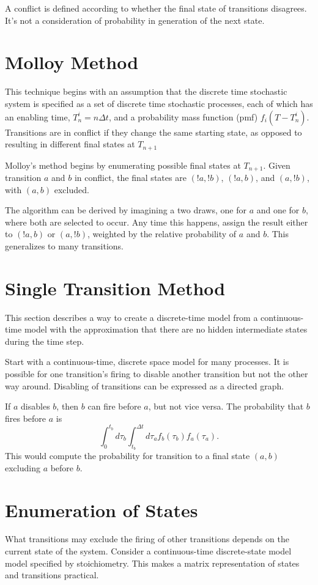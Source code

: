 \documentclass{article}
\begin{document}
A conflict is defined according to whether the
final state of transitions disagrees. It's not a consideration
of probability in generation of the next state.


\section{Molloy Method}
This technique begins with an assumption that
the discrete time stochastic system is specified as a
set of discrete time stochastic processes, each of which
has an enabling time, $T^i_n=n\Delta t$, and a probability
mass function (pmf) $f_i(T-T^i_n)$. Transitions are in
conflict if they change the same starting state, as opposed
to resulting in different final states at $T_{n+1}$

Molloy's method begins by enumerating possible final
states at $T_{n+1}$. Given transition $a$ and $b$ in conflict,
the final states are $(!a,!b)$, $(!a,b)$, and $(a,!b)$,
with $(a,b)$ excluded.

The algorithm can be derived by imagining a two draws, one
for $a$ and one for $b$, where both are selected to occur.
Any time this happens, assign the result either to
$(!a,b)$ or $(a,!b)$, weighted by the relative probability
of $a$ and $b$. This generalizes to many transitions.


\section{Single Transition Method}
This section describes a way to create a discrete-time
model from a continuous-time model with the approximation
that there are no hidden intermediate states during the
time step.

Start with a continuous-time, discrete space model
for many processes.
It is possible for one transition's firing to disable
another transition but not the other way around.
Disabling of transitions can be expressed as a directed
graph.

If $a$ disables $b$, then $b$ can fire before $a$, but not
vice versa. The probability that $b$ fires before $a$ is
\begin{equation}
  \int_0^{t_b}d\tau_b\int_{t_b}^{\Delta t}d\tau_a
  f_b(\tau_b)f_a(\tau_a).
\end{equation}
This would compute the probability for transition to
a final state $(a,b)$ excluding $a$ before $b$.


\section{Enumeration of States}
What transitions may exclude the firing of other
transitions depends on the current state of the
system. Consider a continuous-time discrete-state
model model specified by stoichiometry. This makes
a matrix representation of states and transitions
practical.
\end{document}
